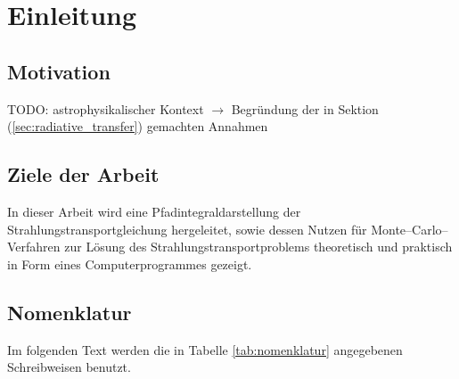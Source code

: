 	\chapter{Einleitung}
	\section{Motivation}
	TODO: astrophysikalischer Kontext $\rightarrow$ Begründung der in Sektion (\ref{sec:radiative_transfer}) gemachten Annahmen
	\section{Ziele der Arbeit}
	In dieser Arbeit wird eine Pfadintegraldarstellung der Strahlungstransportgleichung hergeleitet, sowie dessen Nutzen für Monte--Carlo--Verfahren zur Lösung des Strahlungstransportproblems theoretisch und praktisch in Form eines Computerprogrammes gezeigt.
	
	\section{Nomenklatur}\label{subsec:nomenklatur}
	Im folgenden Text werden die in Tabelle \ref{tab:nomenklatur} angegebenen Schreibweisen benutzt.

